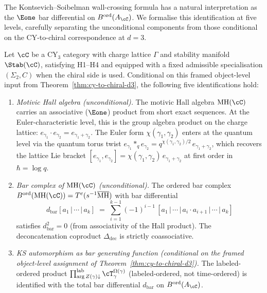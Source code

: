 The Kontsevich--Soibelman wall-crossing formula has a natural interpretation as the $\Eone$ bar differential on $B^{\mathrm{ord}}(A_\cC)$. We formalise this identification at five levels, carefully separating the unconditional components from those conditional on the CY-to-chiral correspondence at $d = 3$.

\begin{conjecture}
\label{conj:categorical-ks-bar}
\ClaimStatusConjectured
Let $\cC$ be a CY$_3$ category with charge lattice $\Gamma$ and stability manifold $\Stab(\cC)$, satisfying H1--H4 and equipped with a fixed admissible specialisation $(\Sigma_2,C)$ when the chiral side is used. Conditional on this framed object-level input from Theorem~\ref{thm:cy-to-chiral-d3}, the following five identifications hold:

\begin{enumerate}[label=\textup{(L\arabic*)}]

\item\label{cat-level:hall} \emph{Motivic Hall algebra \textup{(unconditional)}.} The motivic Hall algebra $\mathrm{MH}(\cC)$ carries an associative ($\Eone$) product from short exact sequences. At the Euler-characteristic level, this is the group algebra product on the charge lattice: $e_{\gamma_1} \cdot e_{\gamma_2} = e_{\gamma_1 + \gamma_2}$. The Euler form $\chi(\gamma_1, \gamma_2)$ enters at the quantum level via the quantum torus twist $e_{\gamma_1} \ast_q e_{\gamma_2} = q^{\chi(\gamma_1, \gamma_2)/2} \, e_{\gamma_1 + \gamma_2}$, which recovers the lattice Lie bracket $[e_{\gamma_1}, e_{\gamma_2}] = \chi(\gamma_1, \gamma_2) \, e_{\gamma_1+\gamma_2}$ at first order in $\hbar = \log q$.

\item\label{cat-level:bar} \emph{Bar complex of $\mathrm{MH}(\cC)$ \textup{(unconditional)}.} The ordered bar complex $B^{\mathrm{ord}}(\mathrm{MH}(\cC)) = T^c(s^{-1}\overline{\mathrm{MH}})$ with bar differential
\[
 d_{\mathrm{bar}}[a_1 \,|\, \cdots \,|\, a_k] \;=\; \sum_{i=1}^{k-1} (-1)^{i-1}\, [a_1 \,|\, \cdots \,|\, a_i \cdot a_{i+1} \,|\, \cdots \,|\, a_k]
\]
satisfies $d_{\mathrm{bar}}^2 = 0$ (from associativity of the Hall product). The deconcatenation coproduct $\Delta_{\mathrm{dec}}$ is strictly coassociative.

\item\label{cat-level:ks} \emph{KS automorphism as bar generating function \textup{(conditional on the framed object-level assignment of Theorem~\textup{\ref{thm:cy-to-chiral-d3}})}.} The labeled-ordered product $\prod_{\arg Z(\gamma) \downarrow}^{\mathrm{lab}} \cT_\gamma^{\Omega(\gamma)}$ (labeled-ordered, not time-ordered) is identified with the total bar differential $d_{\mathrm{bar}}$ on $B^{\mathrm{ord}}(A_\cC)$.


\end{enumerate}
\end{conjecture}
